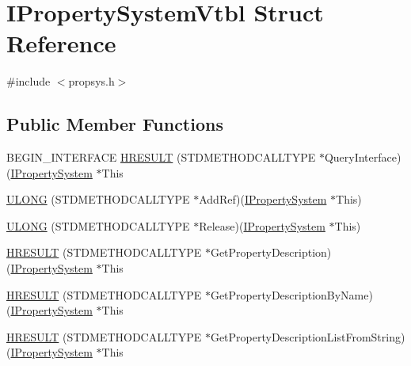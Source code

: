 \hypertarget{struct_i_property_system_vtbl}{}\section{I\+Property\+System\+Vtbl Struct Reference}
\label{struct_i_property_system_vtbl}


{\ttfamily \#include $<$propsys.\+h$>$}

\subsection*{Public Member Functions}
\begin{DoxyCompactItemize}
\item 
B\+E\+G\+I\+N\+\_\+\+I\+N\+T\+E\+R\+F\+A\+CE \hyperlink{struct_i_property_system_vtbl_ad7340fd9b8bceaafd8638aa5dd40c422}{H\+R\+E\+S\+U\+LT} (S\+T\+D\+M\+E\+T\+H\+O\+D\+C\+A\+L\+L\+T\+Y\+PE $\ast$Query\+Interface)(\hyperlink{propsys_8h_ab577bba4a52d519b12be02b0b88b71d1}{I\+Property\+System} $\ast$This
\item 
\hyperlink{struct_i_property_system_vtbl_a58a7217a43134bf208df90c557596d07}{U\+L\+O\+NG} (S\+T\+D\+M\+E\+T\+H\+O\+D\+C\+A\+L\+L\+T\+Y\+PE $\ast$Add\+Ref)(\hyperlink{propsys_8h_ab577bba4a52d519b12be02b0b88b71d1}{I\+Property\+System} $\ast$This)
\item 
\hyperlink{struct_i_property_system_vtbl_a9e8e58c39cbc06e168c32c7fb7fd0477}{U\+L\+O\+NG} (S\+T\+D\+M\+E\+T\+H\+O\+D\+C\+A\+L\+L\+T\+Y\+PE $\ast$Release)(\hyperlink{propsys_8h_ab577bba4a52d519b12be02b0b88b71d1}{I\+Property\+System} $\ast$This)
\item 
\hyperlink{struct_i_property_system_vtbl_af558fccd435f0597e588a284ae7c064e}{H\+R\+E\+S\+U\+LT} (S\+T\+D\+M\+E\+T\+H\+O\+D\+C\+A\+L\+L\+T\+Y\+PE $\ast$Get\+Property\+Description)(\hyperlink{propsys_8h_ab577bba4a52d519b12be02b0b88b71d1}{I\+Property\+System} $\ast$This
\item 
\hyperlink{struct_i_property_system_vtbl_a5a433a94914f0560d36555a998385861}{H\+R\+E\+S\+U\+LT} (S\+T\+D\+M\+E\+T\+H\+O\+D\+C\+A\+L\+L\+T\+Y\+PE $\ast$Get\+Property\+Description\+By\+Name)(\hyperlink{propsys_8h_ab577bba4a52d519b12be02b0b88b71d1}{I\+Property\+System} $\ast$This
\item 
\hyperlink{struct_i_property_system_vtbl_a40a1590fcb553a0a27dbd054edc77fac}{H\+R\+E\+S\+U\+LT} (S\+T\+D\+M\+E\+T\+H\+O\+D\+C\+A\+L\+L\+T\+Y\+PE $\ast$Get\+Property\+Description\+List\+From\+String)(\hyperlink{propsys_8h_ab577bba4a52d519b12be02b0b88b71d1}{I\+Property\+System} $\ast$This

\end{DoxyCompactItemize}
